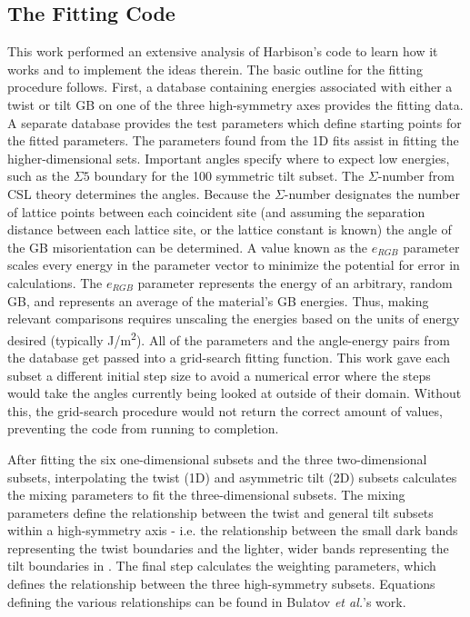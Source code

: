 \documentclass[twoside,senior]{BYUPhys}
\begin{document}
\subsection{The Fitting Code\label{code:fitting}}
This work performed an extensive analysis of Harbison's code to learn how it works and to implement the ideas therein.  The basic outline for the fitting procedure follows.  First, a database containing energies associated with either a twist or tilt GB on one of the three high-symmetry axes provides the fitting data.  A separate database provides the test parameters which define starting points for the fitted parameters.  The parameters found from the 1D fits assist in fitting the higher-dimensional sets.  Important angles specify where to expect low energies, such as the $\Sigma5$ boundary for the \textlangle{}100\textrangle{} symmetric tilt subset.  The $\Sigma$-number from CSL theory determines the angles. Because the $\Sigma$-number designates the number of lattice points between each coincident site (and assuming the separation distance between each lattice site, or the lattice constant is known) the angle of the GB misorientation can be determined.  A value known as the $e_{RGB}$ parameter scales every energy in the parameter vector to minimize the potential for error in calculations. The $e_{RGB}$ parameter represents the energy of an arbitrary, random GB, and represents an average of the material's GB energies.  Thus, making relevant comparisons requires unscaling the energies based on the units of energy desired (typically J/m\textsuperscript{2}).  All of the parameters and the angle-energy pairs from the database get passed into a grid-search fitting function.  This work gave each subset a different initial step size to avoid a numerical error where the steps would take the angles currently being looked at outside of their domain. Without this, the grid-search procedure would not return the correct amount of values, preventing the code from running to completion.

After fitting the six one-dimensional subsets and the three two-dimensional subsets, interpolating the twist (1D) and asymmetric tilt (2D) subsets calculates the mixing parameters to fit the three-dimensional subsets.  The mixing parameters define the relationship between the twist and general tilt subsets within a high-symmetry axis - i.e. the relationship between the small dark bands representing the twist boundaries and the lighter, wider bands representing the tilt boundaries in .  The final step calculates the weighting parameters, which defines the relationship between the three high-symmetry subsets.  Equations defining the various relationships can be found in Bulatov \emph{et al.}'s work.\cite{bulatov2014}
\end{document}
